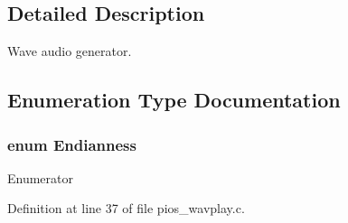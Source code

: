 \subsection{Detailed Description}
Wave audio generator. 

\subsection{Enumeration Type Documentation}
\hypertarget{group___p_i_o_s___w_a_v_p_l_a_y_ga4f3ee12da30a1e47c52dc137b4627cab}{
\subsubsection[{Endianness}]{\setlength{\rightskip}{0pt plus 5cm}enum {\bf Endianness}}}\label{group___p_i_o_s___w_a_v_p_l_a_y_ga4f3ee12da30a1e47c52dc137b4627cab}
\begin{Desc}
\item[Enumerator]\par
\begin{description}
\item[{\em 
\hypertarget{group___p_i_o_s___w_a_v_p_l_a_y_gga4f3ee12da30a1e47c52dc137b4627caba66c163903fb08aef1735714dbb818cc7}{Little\-Endian}\label{group___p_i_o_s___w_a_v_p_l_a_y_gga4f3ee12da30a1e47c52dc137b4627caba66c163903fb08aef1735714dbb818cc7}
}]\item[{\em 
\hypertarget{group___p_i_o_s___w_a_v_p_l_a_y_gga4f3ee12da30a1e47c52dc137b4627cabab90b00401d08d0ecc6b6c2c54db50d6b}{Big\-Endian}\label{group___p_i_o_s___w_a_v_p_l_a_y_gga4f3ee12da30a1e47c52dc137b4627cabab90b00401d08d0ecc6b6c2c54db50d6b}
}]\end{description}
\end{Desc}


Definition at line 37 of file pios\-\_\-wavplay.\-c.



